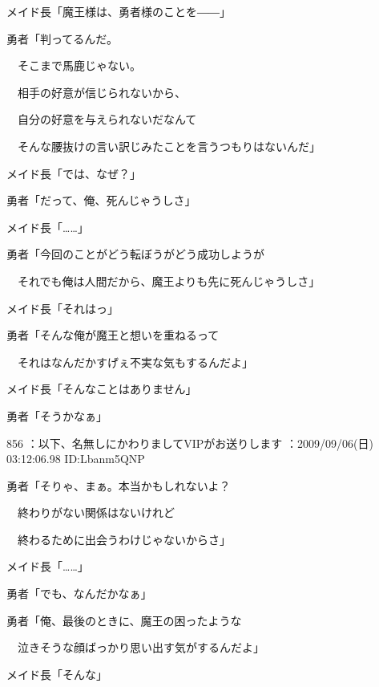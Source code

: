 \documentclass[a4j,twocolumn]{tarticle}
\begin{document}
メイド長「魔王様は、勇者様のことを――」 



勇者「判ってるんだ。\par{} 
　そこまで馬鹿じゃない。\par{} 
　相手の好意が信じられないから、\par{} 
　自分の好意を与えられないだなんて\par{} 
　そんな腰抜けの言い訳じみたことを言うつもりはないんだ」 



メイド長「では、なぜ？」 



勇者「だって、俺、死んじゃうしさ」 



メイド長「……」 



勇者「今回のことがどう転ぼうがどう成功しようが\par{} 
　それでも俺は人間だから、魔王よりも先に死んじゃうしさ」 



メイド長「それはっ」 



勇者「そんな俺が魔王と想いを重ねるって\par{} 
　それはなんだかすげぇ不実な気もするんだよ」 



メイド長「そんなことはありません」 



勇者「そうかなぁ」 

	
    
    

856 ：以下、名無しにかわりましてVIPがお送りします ：2009/09/06(日) 03:12:06.98 ID:Lbanm5QNP 


勇者「そりゃ、まぁ。本当かもしれないよ？\par{} 
　終わりがない関係はないけれど\par{} 
　終わるために出会うわけじゃないからさ」 



メイド長「……」 



勇者「でも、なんだかなぁ」 



勇者「俺、最後のときに、魔王の困ったような\par{} 
　泣きそうな顔ばっかり思い出す気がするんだよ」 



メイド長「そんな」 
\end{document}
